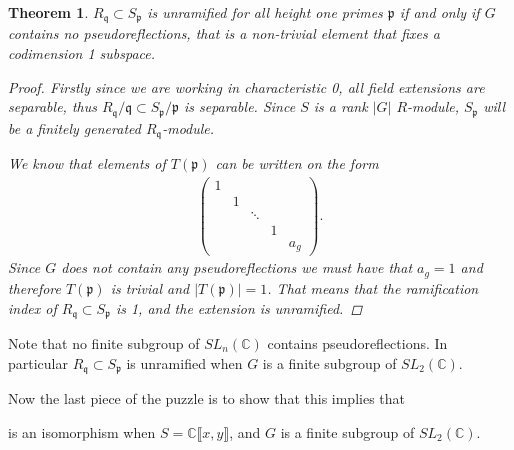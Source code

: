 \documentclass[11pt, a4paper, english]{article}
\newtheorem{theorem}{Theorem}[section]
\theoremstyle{definition}
\newcommand{\C}{\mathbb{C}}
\DeclareMathOperator{\End}{End}
\begin{document}
\begin{theorem}
\label{thm:unramified_pseudoreflections}
$R_\mathfrak{q} \subset S_\mathfrak{p}$ is unramified for all height one primes $\mathfrak{p}$ if and only if $G$ contains no pseudoreflections, that is a non-trivial element that fixes a codimension 1 subspace.
\begin{proof}
Firstly since we are working in characteristic 0, all field extensions are separable, thus $R_\mathfrak{q}/\mathfrak{q} \subset S_\mathfrak{p}/\mathfrak{p}$ is separable. Since $S$ is a rank $|G|$ $R$-module, $S_\mathfrak{p}$ will be a finitely generated $R_\mathfrak{q}$-module.

We know that elements of $T(\mathfrak{p})$ can be written on the form
\begin{align*}
\begin{pmatrix}
1\\
& 1\\
&& \ddots\\
&&&1\\
&&&& a_g
\end{pmatrix}.
\end{align*}
Since $G$ does not contain any pseudoreflections we must have that $a_g = 1$ and therefore $T(\mathfrak{p})$ is trivial and $|T(\mathfrak{p})| = 1$. That means that the ramification index of $R_\mathfrak{q} \subset S_\mathfrak{p}$ is 1, and the extension is unramified.
\end{proof}
\end{theorem}
Note that no finite subgroup of $SL_n(\C)$ contains pseudoreflections. In particular $R_\mathfrak{q} \subset S_\mathfrak{p}$ is unramified when $G$ is a finite subgroup of $SL_2(\C)$.

Now the last piece of the puzzle is to show that this implies that
\begin{center}
\end{center}
is an isomorphism when $S = \C\llbracket x, y \rrbracket$, and $G$ is a finite subgroup of $SL_2(\C)$.
\end{document}
